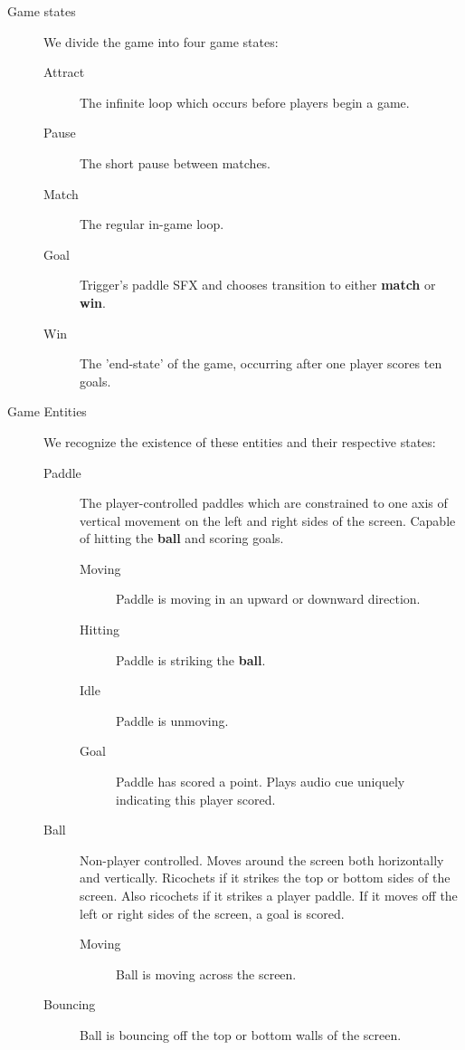 \documentclass{report}
\newcommand{\state}[1]{\textbf{#1}}
\newcommand{\ball}{\textbf{ball}\xspace}
\begin{document}
\begin{description}
    \item[Game states] We divide the game into four game states:
    \begin{description}
        \item[Attract] The infinite loop which occurs before players begin a game.
        \item[Pause] The short pause between matches.
        \item[Match] The regular in-game loop.
        \item[Goal] Trigger's paddle SFX and chooses transition to either \state{match} or \state{win}. 
        \item[Win]   The 'end-state' of the game, occurring after one player scores ten goals.
    \end{description}
    \item[Game Entities] We recognize the existence of these entities and their respective states: 
    \begin{description}
        \item[Paddle] The player-controlled paddles which are constrained to one axis of vertical movement on the left and right sides of the screen. Capable of hitting the \ball and scoring goals.
        \begin{description}
            \item[Moving] Paddle is moving in an upward or downward direction.
            \item[Hitting] Paddle is striking the \ball.  
            \item[Idle] Paddle is unmoving.
            \item[Goal] Paddle has scored a point. Plays audio cue uniquely indicating this player scored.
        \end{description} 
        \item[Ball] Non-player controlled. Moves around the screen both horizontally and vertically. Ricochets if it strikes the top or bottom sides of the screen. Also ricochets if it strikes a player paddle. If it moves off the left or right sides of the screen, a goal is scored. 
        \begin{description}
            \item[Moving] Ball is moving across the screen.
        \end{description}
            \item[Bouncing] Ball is bouncing off the top or bottom walls of the screen. 
    \end{description}
\end{description}
\end{document}
